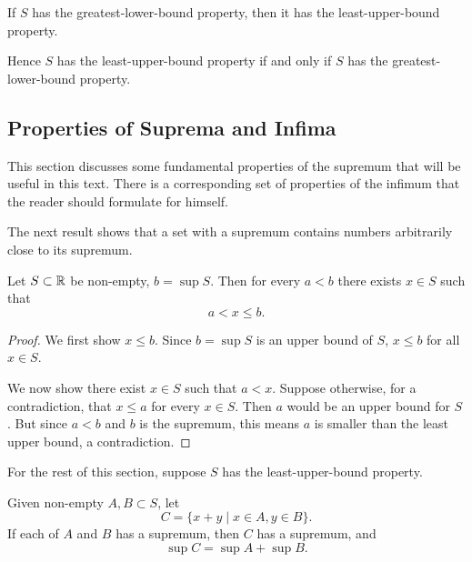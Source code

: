 \begin{corollary}
If $S$ has the greatest-lower-bound property, then it has the least-upper-bound property.

Hence $S$ has the least-upper-bound property if and only if $S$ has the greatest-lower-bound property.
\end{corollary}
\pagebreak

\subsection{Properties of Suprema and Infima}
This section discusses some fundamental properties of the supremum that will be useful in this text. There is a corresponding set of properties of the infimum that the reader should formulate for himself.

The next result shows that a set with a supremum contains numbers arbitrarily close to its supremum.

\begin{lemma}\label{lemma:sup-approx}
Let $S\subset\mathbb R$ be non-empty, $b=\sup S$. Then for every $a<b$ there exists $x\in S$ such that
\[a<x\le b.\]
\end{lemma}

\begin{proof}
We first show $x\le b$. Since $b=\sup S$ is an upper bound of $S$, $x\le b$ for all $x\in S$.

We now show there exist $x\in S$ such that $a<x$. Suppose otherwise, for a contradiction, that $x\le a$ for every $x\in S$. Then $a$ would be an upper bound for $S$. But since $a<b$ and $b$ is the supremum, this means $a$ is smaller than the least upper bound, a contradiction.
\end{proof}

For the rest of this section, suppose $S$ has the least-upper-bound property.

\begin{lemma}
Given non-empty $A,B\subset S$, let
\[C=\{x+y\mid x\in A,y\in B\}.\]
If each of $A$ and $B$ has a supremum, then $C$ has a supremum, and
\[\sup C=\sup A+\sup B.\]
\end{lemma}

